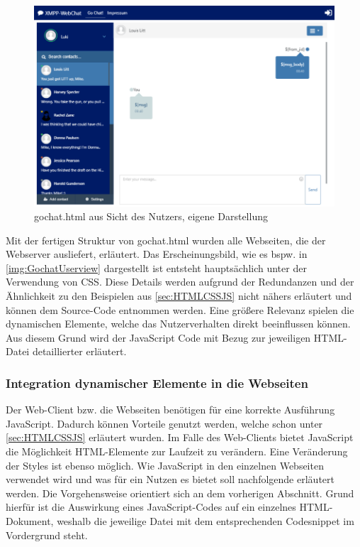 \documentclass[a4paper,titlepage,halfparskip,12pt]{scrreprt}
\begin{document}
\begin{onehalfspacing}
\begin{figure}[h]
	\centering
	\includegraphics[width=\linewidth]{images/GochatUserAnsicht}
	\caption{gochat.html aus Sicht des Nutzers, eigene Darstellung}
	\label{img:GochatUserview}
\end{figure}
Mit der fertigen Struktur von gochat.html wurden alle Webseiten, die der Webserver ausliefert, erläutert. Das Erscheinungsbild, wie es bspw. in \autoref{img:GochatUserview} dargestellt ist entsteht hauptsächlich unter der Verwendung von \ac{CSS}. Diese Details werden aufgrund der Redundanzen und der Ähnlichkeit zu den Beispielen aus \autoref{sec:HTMLCSSJS} nicht nähers erläutert und können dem Source-Code entnommen werden. Eine größere Relevanz spielen die dynamischen Elemente, welche das Nutzerverhalten direkt beeinflussen können. Aus diesem Grund wird der JavaScript Code mit Bezug zur jeweiligen HTML-Datei detaillierter erläutert.

\subsubsection*{Integration dynamischer Elemente in die Webseiten}
\label{subsubsec:DynamischeElementeWebseiten}
Der Web-Client bzw. die Webseiten benötigen für eine korrekte Ausführung JavaScript. Dadurch können Vorteile genutzt werden, welche schon unter \autoref{sec:HTMLCSSJS} erläutert wurden. Im Falle des Web-Clients bietet JavaScript die Möglichkeit HTML-Elemente zur Laufzeit zu verändern. Eine Veränderung der Styles ist ebenso möglich. Wie JavaScript in den einzelnen Webseiten verwendet wird und was für ein Nutzen es bietet soll nachfolgende erläutert werden. Die Vorgehensweise orientiert sich an dem vorherigen Abschnitt. Grund hierfür ist die Auswirkung eines JavaScript-Codes auf ein einzelnes \ac{HTML}-Dokument, weshalb die jeweilige Datei mit dem entsprechenden Codesnippet im Vordergrund steht.


\end{onehalfspacing}
\end{document}
